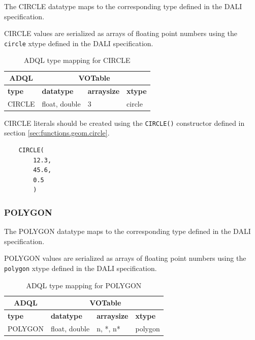 \documentclass[11pt,a4paper]{ivoa}
\newcommand{\DALIspec} {DALI specification\xspace}
\begin{document}
The CIRCLE datatype maps to the corresponding type defined in the
\DALIspec.

CIRCLE values are serialized as arrays of floating point numbers
using the \verb:circle: xtype defined in the \DALIspec.

\begin{table}[thm]\footnotesize
    \begin{tabular}
        {|p{}|p{}|p{}|p{}|}
        \hline

        \hline
        \multicolumn{1}{|c|}{\textbf{ADQL}} &
        \multicolumn{3}{|c|}{\textbf{VOTable}}
        \tabularnewline
        
        \hline
        \textbf{type} &
        \textbf{datatype} &
        \textbf{arraysize} &
        \textbf{xtype}
        \tabularnewline

        \hline
        CIRCLE &
        float, double &
        3 &
        circle
        \tabularnewline

        \hline
    \end{tabular}
    \caption{ADQL type mapping for CIRCLE}
    \label{table:types.geom.circle}
\end{table}

CIRCLE literals should be created using the \verb:CIRCLE():
constructor defined in section \ref{sec:functions.geom.circle}.

\begin{verbatim}
    CIRCLE(
        12.3,
        45.6,
        0.5
        )
\end{verbatim}

\subsubsection{POLYGON}
\label{sec:types.geom.polygon}

The POLYGON datatype maps to the corresponding type defined in the
\DALIspec.

POLYGON values are serialized as arrays of floating point numbers
using the \verb:polygon: xtype defined in the \DALIspec.

\begin{table}[thm]\footnotesize
    \begin{tabular}
        {|p{}|p{}|p{}|p{}|}
        \hline

        \hline
        \multicolumn{1}{|c|}{\textbf{ADQL}} &
        \multicolumn{3}{|c|}{\textbf{VOTable}}
        \tabularnewline
        
        \hline
        \textbf{type} &
        \textbf{datatype} &
        \textbf{arraysize} &
        \textbf{xtype}
        \tabularnewline

        \hline
        POLYGON &
        float, double &
        n, *, n* &
        polygon
        \tabularnewline

        \hline
    \end{tabular}
    \caption{ADQL type mapping for POLYGON}
    \label{table:types.geom.polygon}
\end{table}
\end{document}

